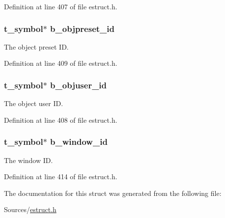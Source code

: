 Definition at line 407 of file estruct.\-h.

\hypertarget{struct__ebox_adc377263d208d1051f4a0997868b1155}{
\subsubsection[{b\-\_\-objpreset\-\_\-id}]{\setlength{\rightskip}{0pt plus 5cm}t\-\_\-symbol$\ast$ b\-\_\-objpreset\-\_\-id}}\label{struct__ebox_adc377263d208d1051f4a0997868b1155}
The object preset I\-D. 

Definition at line 409 of file estruct.\-h.

\hypertarget{struct__ebox_ae324f65e10196cc7e166652e8d7d394d}{
\subsubsection[{b\-\_\-objuser\-\_\-id}]{\setlength{\rightskip}{0pt plus 5cm}t\-\_\-symbol$\ast$ b\-\_\-objuser\-\_\-id}}\label{struct__ebox_ae324f65e10196cc7e166652e8d7d394d}
The object user I\-D. 

Definition at line 408 of file estruct.\-h.

\hypertarget{struct__ebox_a7033df943e798c68e3a6117785c2d79e}{
\subsubsection[{b\-\_\-window\-\_\-id}]{\setlength{\rightskip}{0pt plus 5cm}t\-\_\-symbol$\ast$ b\-\_\-window\-\_\-id}}\label{struct__ebox_a7033df943e798c68e3a6117785c2d79e}
The window I\-D. 

Definition at line 414 of file estruct.\-h.



The documentation for this struct was generated from the following file\-:\begin{DoxyCompactItemize}
\item 
Sources/\hyperlink{estruct_8h}{estruct.\-h}\end{DoxyCompactItemize}
